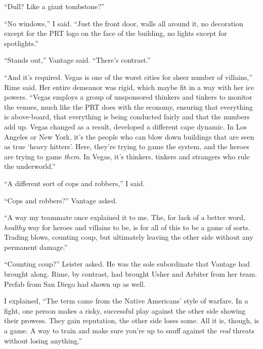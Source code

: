 ``Dull?  Like a giant tombstone?''



``No windows,'' I said.  ``Just the front door, walls all around it, no decoration except for the PRT logo on the face of the building, no lights except for spotlights.''



``Stands out,'' Vantage said.  ``There's contrast.''



``And it's required.  Vegas is one of the worst cities for sheer number of villains,'' Rime said.  Her entire demeanor was rigid, which maybe fit in a way with her ice powers.  ``Vegas employs a group of unsponsored thinkers and tinkers to monitor the venues, much like the PRT does with the economy, ensuring that everything is above-board, that everything is being conducted fairly and that the numbers add up.  Vegas changed as a result, developed a different cape dynamic.  In Los Angeles or New York, it's the people who can blow down buildings that are seen as true `heavy hitters'.  Here, they're trying to game the system, and the heroes are trying to game \emph{them}.  In Vegas, it's thinkers, tinkers and strangers who rule the underworld.''



``A different sort of cops and robbers,'' I said.



``Cops and robbers?''  Vantage asked.



``A way my teammate once explained it to me.  The, for lack of a better word, \emph{healthy} way for heroes and villains to be, is for all of this to be a game of sorts.  Trading blows, counting coup, but ultimately leaving the other side without any permanent damage.''



``Counting coup?'' Leister asked.  He was the sole subordinate that Vantage had brought along.  Rime, by contrast, had brought Usher and Arbiter from her team.  Prefab from San Diego had shown up as well.



I explained, ``The term came from the Native Americans' style of warfare.  In a fight, one person makes a risky, successful play against the other side showing their prowess.  They gain reputation, the other side loses some.  All it is, though, is a game.  A way to train and make sure you're up to snuff against the \emph{real} threats without losing anything.''



